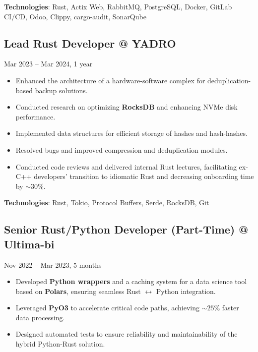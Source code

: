 \documentclass[a4paper,12pt]{article}
\begin{document}
\textbf{Technologies}: Rust, Actix Web, RabbitMQ, PostgreSQL, Docker, GitLab CI/CD, Odoo, Clippy, cargo-audit, SonarQube

\vspace{3mm}

\subsection*{Lead Rust Developer @ YADRO}

\quad Mar 2023 – Mar 2024, 1 year

\begin{itemize}[leftmargin=15pt]
    \item Enhanced the architecture of a hardware-software complex for deduplication-based backup solutions.
    \item Conducted research on optimizing \textbf{RocksDB} and enhancing NVMe disk performance.
    \item Implemented data structures for efficient storage of hashes and hash-hashes.
    \item Resolved bugs and improved compression and deduplication modules.
    \item Conducted code reviews and delivered internal Rust lectures, facilitating ex-C++ developers' transition to idiomatic Rust and decreasing onboarding time by \(\sim 30\%\).
\end{itemize}

\textbf{Technologies}: Rust, Tokio, Protocol Buffers, Serde, RocksDB, Git

\vspace{3mm}

\subsection*{Senior Rust/Python Developer (Part-Time) @ Ultima-bi}

\quad Nov 2022 – Mar 2023, 5 months

\begin{itemize}[leftmargin=15pt]
    \item Developed \textbf{Python wrappers} and a caching system for a data science tool based on \textbf{Polars}, ensuring seamless Rust \(\leftrightarrow\) Python integration.
    \item Leveraged \textbf{PyO3} to accelerate critical code paths, achieving \(\sim 25\%\) faster data processing.
    \item Designed automated tests to ensure reliability and maintainability of the hybrid Python-Rust solution.
\end{itemize}
\end{document}
